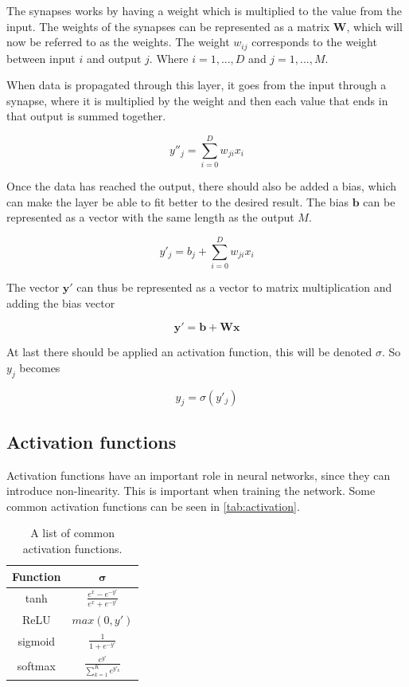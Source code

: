 The synapses works by having a weight which is multiplied to the value from the input.
The weights of the synapses can be represented as a matrix $\bm{W}$, which will now be referred to as the weights.
The weight $w_{ij}$ corresponds to the weight between input $i$ and output $j$.
Where $i = 1, ..., D$ and $j = 1, ..., M$.

When data is propagated through this layer, it goes from the input through a synapse, where it is multiplied by the weight and then each value that ends in that output is summed together.

$$y''_j = \sum_{i=0}^D w_{ji}x_i  $$

Once the data has reached the output, there should also be added a bias, which can make the layer be able to fit better to the desired result.
The bias $\bm{b}$ can be represented as a vector with the same length as the output $M$.

$$y'_j = b_j + \sum_{i=0}^D w_{ji}x_i$$

The vector $\bm{y'}$ can thus be represented as a vector to matrix multiplication and adding the bias vector

$$\bm{y'} = \bm{b} + \bm{W}\bm{x}$$

At last there should be applied an activation function, this will be denoted $\sigma$.
So $y_j$ becomes

$$y_j = \sigma \left(y'_j\right)$$

\subsection{Activation functions}%
\label{sub:Activation functions}

Activation functions have an important role in neural networks, since they can introduce non-linearity. This is important when training the network.
Some common activation functions can be seen in \autoref{tab:activation}.

\begin{table}[H]
\centering
\begin{tabular}{|c|c|}\hline
\textbf{Function} & $\bm{\sigma}$ \\\hline
tanh     & $\frac{e^x - e^{-y'}}{e^x + e^{-y'}}$ \\\hline
ReLU     & $max(0, y')$ \\\hline
sigmoid  & $\frac{1}{1+e^{-y'}}$ \\\hline
softmax  & $\frac{e^{y'}}{\sum^K_{k=1} e^{y'_k}}$ \\\hline
\end{tabular}
\caption{A list of common activation functions.}
\label{tab:activation}
\end{table}

